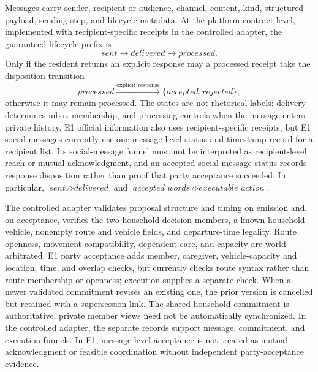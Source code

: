 \documentclass[journal]{IEEEtran}
\begin{document}
Messages carry sender, recipient or audience, channel, content, kind, structured
payload, sending step, and lifecycle metadata. At the platform-contract level,
implemented with recipient-specific receipts in the controlled adapter, the
guaranteed lifecycle prefix is
\begin{equation}
  \textit{sent}\rightarrow\textit{delivered}\rightarrow
  \textit{processed}.
  \label{eq:message-lifecycle}
\end{equation}
Only if the resident returns an explicit response may a processed receipt take
the disposition transition
\begin{equation}
  \textit{processed}\xrightarrow{\text{explicit response}}
  \{\textit{accepted},\textit{rejected}\};
  \label{eq:message-disposition}
\end{equation}
otherwise it may remain processed. The states are not rhetorical labels:
delivery determines inbox membership, and processing controls when the message
enters private history. E1 official information also uses recipient-specific
receipts, but E1 social messages currently use one message-level status and
timestamp record for a recipient list. Its social-message funnel must not be
interpreted as recipient-level reach or mutual acknowledgment, and an accepted
social-message status records response disposition rather than proof that party
acceptance succeeded. In particular,
$\textit{sent}\not\Rightarrow\textit{delivered}$ and
$\textit{accepted words}\not\Rightarrow\textit{executable action}$.

The controlled adapter validates proposal structure and timing on emission and,
on acceptance, verifies the two household decision members, a known household
vehicle, nonempty route and vehicle fields, and departure-time legality. Route
openness, movement compatibility, dependent care, and capacity are world-
arbitrated. E1 party acceptance adds member, caregiver, vehicle-capacity and
location, time, and overlap checks, but currently checks route syntax rather
than route membership or openness; execution supplies a separate check. When a
newer validated commitment revises an existing one, the prior version is
cancelled but retained
with a supersession link. The shared household commitment is authoritative;
private member views need not be automatically synchronized. In the controlled
adapter, the separate records support message, commitment, and execution
funnels. In E1, message-level acceptance is not treated as mutual acknowledgment
or feasible coordination without independent party-acceptance evidence.
\end{document}
